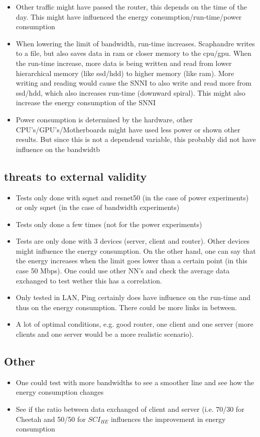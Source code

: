 \documentclass[../thesis.tex]{subfiles}
\begin{document}
\begin{itemize}    \item Other traffic might have passed the router, this depends on the time of the day. This might have influenced the energy consumption/run-time/power consumption
    \item When lowering the limit of bandwidth, run-time increases. Scaphandre writes to a file, but also saves data in ram or closer memory to the cpu/gpu. When the run-time increase, more data is being written and read from lower hierarchical memory (like ssd/hdd) to higher memory (like ram). More writing and reading would cause the SNNI to also write and read more from ssd/hdd, which also increases run-time (downward spiral). This might also increase the energy consumption of the SNNI
    \item Power consumption is determined by the hardware, other CPU's/GPU's/Motherboards might have used less power or shown other results. But since this is not a \color{red}dependend\color{black} variable, this probably did not have influence on the bandwidtb
\end{itemize}

\subsection{threats to external validity}
\begin{itemize}
    \item Tests only done with sqnet and resnet50 (in the case of power experiments) or only sqnet (in the case of bandwidth experiments)
    \item Tests only done a few times (not for the power experiments)
    \item Tests are only done with 3 devices (server, client and router). Other devices might influence the energy consumption. On the other hand, one can say that the energy increases when the limit goes lower than a certain point (in this case 50 Mbps). One could use other NN's and check the average data exchanged to test wether this has a correlation. 
    \item Only tested in LAN, Ping certainly does have influence on the run-time and thus on the energy consumption. There could be more links in between. 
    \item A lot of optimal conditions, e.g. good router, one client and one server (more clients and one server would be a more realistic scenario). 
\end{itemize}
\subsection{Other}
\begin{itemize}
    \item One could test with more bandwidths to see a smoother line and see how the energy consumption changes
    \item See if the ratio between data exchanged of client and server (i.e. 70/30 for Cheetah and 50/50 for $SCI_{HE}$ influences the improvement in energy consumption
\end{itemize}
\end{document}
